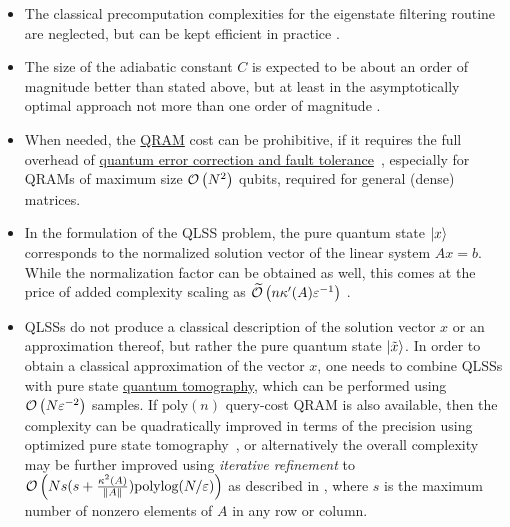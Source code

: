 \begin{refsection}
\begin{itemize}
    \item The classical precomputation complexities for the eigenstate filtering routine are neglected, but can be kept efficient in practice \cite{dong2020efficientPhaseFindingInQSP}.

    \item The size of the adiabatic constant $C$ is expected to be about an order of magnitude better than stated above, but at least in the asymptotically optimal approach not more than one order of magnitude \cite{costa2021OptimalLinearSystem}.

    \item When needed, the \hyperref[prim:QRAM]{QRAM} cost can be prohibitive, if it requires the full overhead of \hyperref[prim:FTQC]{quantum error correction and fault tolerance}~\cite{hann2021resilienceofQRAM}, especially for QRAMs of maximum size $\mathcal{O}\left( N^2 \right)$ qubits, required for general (dense) matrices.

    \item In the formulation of the QLSS problem, the pure quantum state $\lvert x\rangle$ corresponds to the normalized solution vector of the linear system $Ax=b$. 
    While the normalization factor can be obtained as well, this comes at the price of added complexity scaling as $\widetilde{\mathcal{O}}\left( n\kappa'(A)\varepsilon^{-1} \right)$ \cite[Corollary 32]{chakraborty2018BlockMatrixPowers}.

    \item QLSSs do not produce a classical description of the solution vector $x$ or an approximation thereof, but rather the pure quantum state $\lvert\tilde x\rangle$. In order to obtain a classical approximation of the vector $x$, one needs to combine QLSSs with pure state \hyperref[prim:Tomography]{quantum tomography}, which can be performed using $\mathcal{O}\left( N\varepsilon^{-2} \right)$ samples. 
    If $\text{poly}(n)$ query-cost QRAM is also available, then the complexity can be quadratically improved in terms of the precision using optimized pure state tomography~\cite{apeldoorn2022TomographyStatePreparationUnitaries}, or alternatively the overall complexity may be further improved using \emph{iterative refinement} to $\mathcal{O}\left( Ns (s+\frac{\kappa^2(A)}{\|A\|})\text{polylog}(N/\varepsilon) \right)$ as described in \cite{mohammadisiahroudi2022QEnhancedRegression}, where $s$ is the maximum number of nonzero elements of $A$ in any row or column.


\end{itemize}
\end{refsection}
